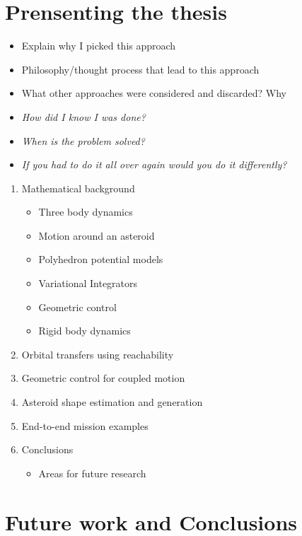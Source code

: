 \section{Prensenting the thesis}
\begin{itemize}
    \item Explain why I picked this approach
    \item Philosophy/thought process that lead to this approach
    \item What other approaches were considered and discarded? Why
    \item \emph{How did I know I was done?}
    \item \emph{When is the problem solved?}
    \item \emph{If you had to do it all over again would you do it differently?}
\end{itemize}

\begin{enumerate}
    \item Mathematical background
        \begin{itemize}
            \item Three body dynamics
            \item Motion around an asteroid
            \item Polyhedron potential models
            \item Variational Integrators
            \item Geometric control
            \item Rigid body dynamics
        \end{itemize}
    \item Orbital transfers using reachability
    \item Geometric control for coupled motion
    \item Asteroid shape estimation and generation
    \item End-to-end mission examples
    \item Conclusions
        \begin{itemize}
            \item Areas for future research
        \end{itemize}
\end{enumerate}

\section{Future work and Conclusions}

